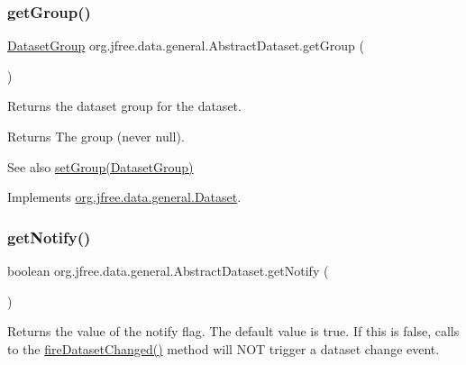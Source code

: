 \subsubsection{\texorpdfstring{get\+Group()}{getGroup()}}
{\footnotesize\ttfamily \mbox{\hyperlink{classorg_1_1jfree_1_1data_1_1general_1_1_dataset_group}{Dataset\+Group}} org.\+jfree.\+data.\+general.\+Abstract\+Dataset.\+get\+Group (\begin{DoxyParamCaption}{ }\end{DoxyParamCaption})}

Returns the dataset group for the dataset.

\begin{DoxyReturn}{Returns}
The group (never {\ttfamily null}).
\end{DoxyReturn}
\begin{DoxySeeAlso}{See also}
\mbox{\hyperlink{classorg_1_1jfree_1_1data_1_1general_1_1_abstract_dataset_ab0442a73adac8fbb69594378b5e354b0}{set\+Group(\+Dataset\+Group)}} 
\end{DoxySeeAlso}


Implements \mbox{\hyperlink{interfaceorg_1_1jfree_1_1data_1_1general_1_1_dataset_a48357df0f5aacd555b094627eb02d473}{org.\+jfree.\+data.\+general.\+Dataset}}.

\mbox{\label{classorg_1_1jfree_1_1data_1_1general_1_1_abstract_dataset_a8c3a906ab325e9e0c8a9041ce9f2d617}} 
\subsubsection{\texorpdfstring{get\+Notify()}{getNotify()}}
{\footnotesize\ttfamily boolean org.\+jfree.\+data.\+general.\+Abstract\+Dataset.\+get\+Notify (\begin{DoxyParamCaption}{ }\end{DoxyParamCaption})}

Returns the value of the notify flag. The default value is {\ttfamily true}. If this is {\ttfamily false}, calls to the \mbox{\hyperlink{classorg_1_1jfree_1_1data_1_1general_1_1_abstract_dataset_a95eadb1f154c4b4310bd04792617e633}{fire\+Dataset\+Changed()}} method will N\+OT trigger a dataset change event.

